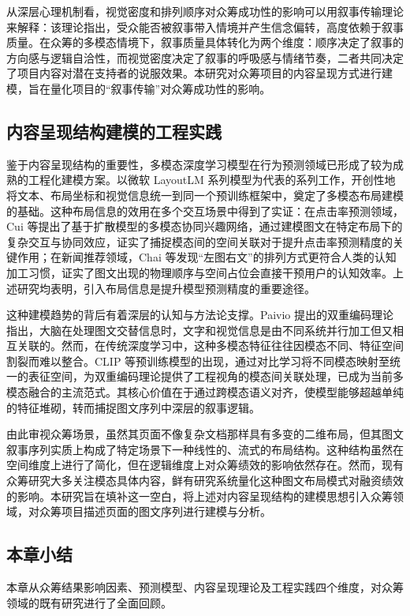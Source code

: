 从深层心理机制看，视觉密度和排列顺序对众筹成功性的影响可以用叙事传输理论来解释：该理论指出，受众能否被叙事带入情境并产生信念偏转，高度依赖于叙事质量\cite{ref42}。在众筹的多模态情境下，叙事质量具体转化为两个维度：顺序决定了叙事的方向感与逻辑自洽性，而视觉密度决定了叙事的呼吸感与情绪节奏，二者共同决定了项目内容对潜在支持者的说服效果。本研究对众筹项目的内容呈现方式进行建模，旨在量化项目的“叙事传输”对众筹成功性的影响。

\subsection{内容呈现结构建模的工程实践}
鉴于内容呈现结构的重要性，多模态深度学习模型在行为预测领域已形成了较为成熟的工程化建模方案。以微软 LayoutLM 系列模型为代表的系列工作，开创性地将文本、布局坐标和视觉信息统一到同一个预训练框架中，奠定了多模态布局建模的基础\cite{ref43,ref44}。这种布局信息的效用在多个交互场景中得到了实证：在点击率预测领域，Cui 等提出了基于扩散模型的多模态协同兴趣网络，通过建模图文在特定布局下的复杂交互与协同效应，证实了捕捉模态间的空间关联对于提升点击率预测精度的关键作用\cite{ref45}；在新闻推荐领域，Chai 等发现“左图右文”的排列方式更符合人类的认知加工习惯，证实了图文出现的物理顺序与空间占位会直接干预用户的认知效率。上述研究均表明，引入布局信息是提升模型预测精度的重要途径。

这种建模趋势的背后有着深层的认知与方法论支撑。Paivio 提出的双重编码理论指出，大脑在处理图文交替信息时，文字和视觉信息是由不同系统并行加工但又相互关联的\cite{ref46}。然而，在传统深度学习中，这种多模态特征往往因模态不同、特征空间割裂而难以整合。CLIP 等预训练模型的出现，通过对比学习将不同模态映射至统一的表征空间，为双重编码理论提供了工程视角的模态间关联处理，已成为当前多模态融合的主流范式\cite{ref47}。其核心价值在于通过跨模态语义对齐，使模型能够超越单纯的特征堆砌，转而捕捉图文序列中深层的叙事逻辑。

由此审视众筹场景，虽然其页面不像复杂文档那样具有多变的二维布局，但其图文叙事序列实质上构成了特定场景下一种线性的、流式的布局结构。这种结构虽然在空间维度上进行了简化，但在逻辑维度上对众筹绩效的影响依然存在。然而，现有众筹研究大多关注模态具体内容，鲜有研究系统量化这种图文布局模式对融资绩效的影响。本研究旨在填补这一空白，将上述对内容呈现结构的建模思想引入众筹领域，对众筹项目描述页面的图文序列进行建模与分析。

\subsection{本章小结}
本章从众筹结果影响因素、预测模型、内容呈现理论及工程实践四个维度，对众筹领域的既有研究进行了全面回顾。

